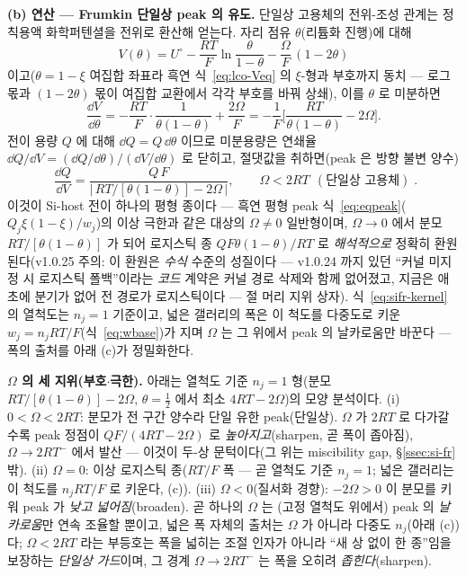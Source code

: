 \textbf{(b) 연산 --- Frumkin 단일상 peak 의 유도.} 단일상 고용체의 전위-조성 관계는 정칙용액 화학퍼텐셜을 전위로
환산해 얻는다. 자리 점유 $\theta$(리튬화 진행)에 대해
\begin{equation}
V(\theta)=U^\circ-\frac{RT}{F}\ln\frac{\theta}{1-\theta}-\frac{\Omega}{F}\,(1-2\theta)
\label{eq:sifr-V}
\end{equation}
이고($\theta{=}1{-}\xi$ 여집합 좌표라 흑연 식~\eqref{eq:lco-Veq} 의 $\xi$-형과 부호까지 동치 --- 로그 몫과
$(1-2\theta)$ 몫이 여집합 교환에서 각각 부호를 바꿔 상쇄), 이를 $\theta$ 로 미분하면
\begin{equation}
\frac{\dd V}{\dd\theta}=-\frac{RT}{F}\cdot\frac{1}{\theta(1-\theta)}+\frac{2\Omega}{F}
=-\frac{1}{F}\Big[\frac{RT}{\theta(1-\theta)}-2\Omega\Big].
\label{eq:sifr-dVdtheta}
\end{equation}
전이 용량 $Q$ 에 대해 $\dd Q=Q\,\dd\theta$ 이므로 미분용량은 연쇄율 $\dd Q/\dd V=(\dd Q/\dd\theta)/(\dd V/\dd\theta)$
로 닫히고, 절댓값을 취하면(peak 은 방향 불변 양수)
\begin{equation}
\boxed{\;\frac{\dd Q}{\dd V}=\frac{Q\,F}{\big|\,RT/[\theta(1-\theta)]-2\Omega\,\big|},
\qquad \Omega<2RT\ \ (\text{단일상 고용체})\;.}
\label{eq:sifr-kernel}
\end{equation}
이것이 Si-host 전이 하나의 평형 종이다 --- 흑연 평형 peak 식~\eqref{eq:eqpeak}($Q_j\xi(1-\xi)/w_j$)의 이상 극한과
같은 대상의 $\Omega\ne0$ 일반형이며, $\Omega{\to}0$ 에서 분모 $RT/[\theta(1-\theta)]$ 가 되어 로지스틱 종
$QF\theta(1-\theta)/RT$ 로 \emph{해석적으로} 정확히 환원된다(v1.0.25 주의: 이 환원은 \emph{수식} 수준의 성질이다
--- v1.0.24 까지 있던 ``커널 미지정 시 로지스틱 폴백''이라는 \emph{코드} 계약은 커널 경로 삭제와 함께 없어졌고,
지금은 애초에 분기가 없어 전 경로가 로지스틱이다 --- 절 머리 지위 상자).
식~\eqref{eq:sifr-kernel} 의 열척도는 $n_j{=}1$ 기준이고, 넓은 갤러리의 폭은 이 척도를 다중도로 키운
$w_j{=}n_jRT/F$(식~\eqref{eq:wbase})가 지며 $\Omega$ 는 그 위에서 peak 의 날카로움만 바꾼다 --- 폭의 출처를
아래 (c)가 정밀화한다.

\begin{signbox}
\textbf{$\Omega$ 의 세 지위(부호$\cdot$극한).} 아래는 열척도 기준 $n_j{=}1$ 형(분모 $RT/[\theta(1-\theta)]-2\Omega$,
$\theta{=}\tfrac12$ 에서 최소 $4RT-2\Omega$)의 모양 분석이다. (i) $0<\Omega<2RT$: 분모가 전 구간 양수라 단일 유한
peak(단일상). $\Omega$ 가 $2RT$ 로 다가갈수록 peak 정점이 $Q F/(4RT-2\Omega)$ 로 \emph{높아지고}(sharpen, 곧 폭이
좁아짐), $\Omega{\to}2RT^-$ 에서 발산 --- 이것이 두-상 문턱이다(그 위는 miscibility gap, \S\ref{ssec:si-fr} 밖). (ii)
$\Omega{=}0$: 이상 로지스틱 종($RT/F$ 폭 --- 곧 열척도 기준 $n_j{=}1$; 넓은 갤러리는 이 척도를 $n_jRT/F$ 로 키운다,
(c)). (iii) $\Omega<0$(질서화 경향): $-2\Omega>0$ 이 분모를 키워 peak 가 \emph{낮고 넓어짐}(broaden). 곧 하나의 $\Omega$
는 (고정 열척도 위에서) peak 의 \emph{날카로움}만 연속 조율할 뿐이고, 넓은 폭 자체의 출처는 $\Omega$ 가 아니라
다중도 $n_j$(아래 (c))다; $\Omega<2RT$ 라는 부등호는 폭을 넓히는 조절 인자가 아니라 ``새 상 없이 한 종''임을 보장하는
\emph{단일상 가드}이며, 그 경계 $\Omega{\to}2RT^-$ 는 폭을 오히려 \emph{좁힌다}(sharpen).
\end{signbox}

